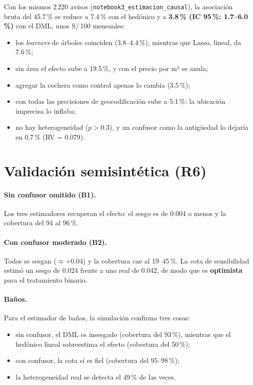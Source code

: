 Con los mismos 2\,220 avisos (\texttt{notebook3\_estimacion\_causal}), la asociación bruta del 45.7\,\% se reduce a 7.4\,\% con el hedónico y a \textbf{3.8\,\% (IC 95\,\%: 1.7--6.0\,\%)} con el DML, unos S/\,100 mensuales:
\begin{itemize}[itemsep=0pt]
\item los \textit{learners} de árboles coinciden (3.8--4.4\,\%), mientras que Lasso, lineal, da 7.6\,\%;
\item sin área el efecto sube a 19.5\,\%, y con el precio por m² se anula;
\item agregar la cochera como control apenas lo cambia (3.5\,\%);
\item con todas las precisiones de geocodificación sube a 5.1\,\%: la ubicación imprecisa lo inflaba;
\item no hay heterogeneidad ($p>0.3$), y un confusor como la antigüedad lo dejaría en 0.7\,\% (RV = 0.079).
\end{itemize}

\section{Validación semisintética (R6)}\label{sec:res_sim}

\begin{table}[H]
\centering\small
\caption{Validación semisintética del estimador binario (100 réplicas por escenario; efecto verdadero 0.10)}\label{tab:sim_b}
\resizebox{0.85\textwidth}{!}{}
\end{table}

\paragraph{Sin confusor omitido (B1).} Los tres estimadores recuperan el efecto: el sesgo es de 0.004 o menos y la cobertura del 94 al 96\,\%.

\paragraph{Con confusor moderado (B2).} Todos se sesgan ($\approx+0.04$) y la cobertura cae al 19--45\,\%. La cota de sensibilidad estimó un sesgo de 0.024 frente a uno real de 0.042, de modo que es \textbf{optimista} para el tratamiento binario.

\paragraph{Baños.} Para el estimador de baños, la simulación confirma tres cosas:
\begin{itemize}[itemsep=0pt]
\item sin confusor, el DML es insesgado (cobertura del 93\,\%), mientras que el hedónico lineal sobreestima el efecto (cobertura del 50\,\%);
\item con confusor, la cota sí es fiel (cobertura del 95--98\,\%);
\item la heterogeneidad real se detecta el 49\,\% de las veces.
\end{itemize}
